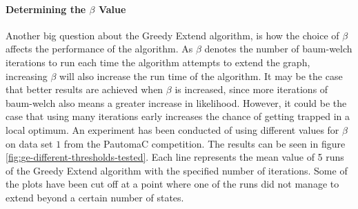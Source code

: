\paragraph{Determining the $\beta$ Value}

Another big question about the Greedy Extend algorithm, is how the choice of $\beta$ affects the performance of the algorithm.
As $\beta$ denotes the number of \gls{baum-welch} iterations to run each time the algorithm attempts to extend the graph, increasing $\beta$ will also increase the run time of the algorithm. It may be the case that better results are achieved when $\beta$ is increased, since more iterations of \gls{baum-welch} also means a greater increase in likelihood. However, it could be the case that using many iterations early increases the chance of getting trapped in a local optimum.
An experiment has been conducted of using different values for $\beta$ on data set $1$ from the PautomaC competition. The results can be seen in figure \ref{fig:ge-different-thresholds-tested}. Each line represents the mean value of 5 runs of the Greedy Extend algorithm with the specified number of iterations. Some of the plots have been cut off at a point where one of the runs did not manage to extend beyond a certain number of states.

